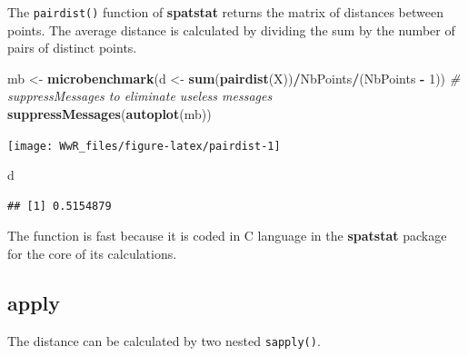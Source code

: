 \documentclass[
  12pt,
  american,
  a4paper,
  extrafontsizes,onecolumn,openright
  ]{memoir}
\newenvironment{Shaded}{\begin{snugshade}}{\end{snugshade}}
\newcommand{\CommentTok}[1]{\textcolor[rgb]{0.56,0.35,0.01}{\textit{#1}}}
\newcommand{\DecValTok}[1]{\textcolor[rgb]{0.00,0.00,0.81}{#1}}
\newcommand{\FunctionTok}[1]{\textcolor[rgb]{0.13,0.29,0.53}{\textbf{#1}}}
\newcommand{\NormalTok}[1]{#1}
\newcommand{\OtherTok}[1]{\textcolor[rgb]{0.56,0.35,0.01}{#1}}
\newcommand{\SpecialCharTok}[1]{\textcolor[rgb]{0.81,0.36,0.00}{\textbf{#1}}}
\begin{document}
The \texttt{pairdist()} function of \textbf{spatstat} returns the matrix of distances between points.
The average distance is calculated by dividing the sum by the number of pairs of distinct points.

\scriptsize

\begin{Shaded}
\begin{Highlighting}[]
\NormalTok{mb }\OtherTok{\textless{}{-}} \FunctionTok{microbenchmark}\NormalTok{(d }\OtherTok{\textless{}{-}} \FunctionTok{sum}\NormalTok{(}\FunctionTok{pairdist}\NormalTok{(X))}\SpecialCharTok{/}\NormalTok{NbPoints}\SpecialCharTok{/}\NormalTok{(NbPoints }\SpecialCharTok{{-}}
    \DecValTok{1}\NormalTok{))}
\CommentTok{\# suppressMessages to eliminate useless messages}
\FunctionTok{suppressMessages}\NormalTok{(}\FunctionTok{autoplot}\NormalTok{(mb))}
\end{Highlighting}
\end{Shaded}

\begin{center}\texttt{[image: WwR\_files/figure-latex/pairdist-1]} \end{center}

\begin{Shaded}
\begin{Highlighting}[]
\NormalTok{d}
\end{Highlighting}
\end{Shaded}

\begin{verbatim}
## [1] 0.5154879
\end{verbatim}

\normalsize

The function is fast because it is coded in C language in the \textbf{spatstat} package for the core of its calculations.

\subsection{apply}\label{apply}

The distance can be calculated by two nested \texttt{sapply()}.

\scriptsize
\end{document}
